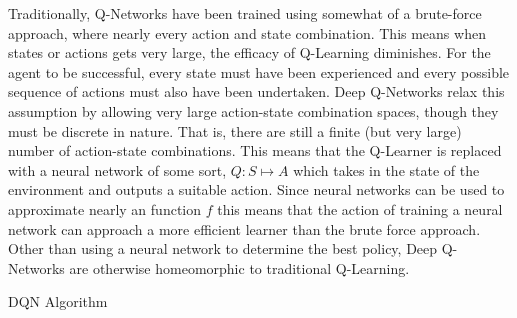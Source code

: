 \documentclass[man, 12pt]{apa6}
\begin{document}
Traditionally, Q-Networks have been trained using somewhat of a brute-force approach, where nearly every action and state combination. This means when states or actions gets very large, the efficacy of Q-Learning diminishes.  For the agent to be successful, every state must have been experienced and every possible sequence of actions must also have been undertaken. Deep Q-Networks relax this assumption by allowing very large action-state combination spaces, though they must be discrete in nature. That is, there are still a finite (but very large) number of action-state combinations. This means that the Q-Learner is replaced with a neural network of some sort, $Q: S \mapsto A$ which takes in the state of the environment and outputs a suitable action. Since neural networks can be used to approximate nearly an function $f$ this means that the action of training a neural network can approach a more efficient learner than the brute force approach. Other than using a neural network to determine the best policy, Deep Q-Networks are otherwise homeomorphic to traditional Q-Learning. 

\begin{algorithm}[H]
\caption{ DQN Algorithm \citep{DBLP:journals/corr/MnihKSGAWR13}}
\end{algorithm}
\FloatBarrier
\end{document}
